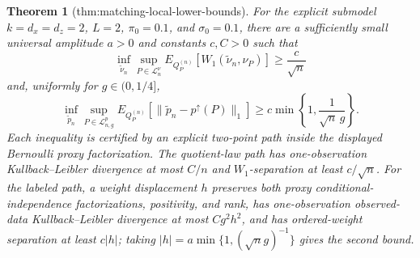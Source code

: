 \documentclass{article}
\newtheorem{theorem}{Theorem}
\begin{document}
\begin{theorem}[thm:matching-local-lower-bounds]\label{thm:matching-local-lower-bounds}
For the explicit submodel \(k=d_x=d_z=2\), \(L=2\), \(\pi_0=0.1\), and \(\sigma_0=0.1\), there are a sufficiently small universal amplitude \(a>0\) and constants \(c,C>0\) such that \[\inf_{\widetilde\nu_n}\sup_{P\in\mathcal L_n^{\nu}}E_{Q_P^{(n)}}[W_1(\widetilde\nu_n,\nu_P)]\ge\frac{c}{\sqrt n}\] and, uniformly for \(g\in(0,1/4]\), \[\inf_{\widetilde p_n}\sup_{P\in\mathcal L_{n,g}^{p}}E_{Q_P^{(n)}}[\lVert\widetilde p_n-p^{\uparrow}(P)\rVert_1]\ge c\min\left\{1,\frac{1}{\sqrt n\,g}\right\}.\] Each inequality is certified by an explicit two-point path inside the displayed Bernoulli proxy factorization. The quotient-law path has one-observation Kullback--Leibler divergence at most \(C/n\) and \(W_1\)-separation at least \(c/\sqrt n\). For the labeled path, a weight displacement \(h\) preserves both proxy conditional-independence factorizations, positivity, and rank, has one-observation observed-data Kullback--Leibler divergence at most \(C g^2h^2\), and has ordered-weight separation at least \(c|h|\); taking \(|h|=a\min\{1,(\sqrt n g)^{-1}\}\) gives the second bound.
\end{theorem}
\end{document}
